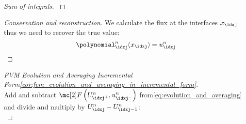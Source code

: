 \begin{proofbox}\nospacing
    \begin{proof}[Sum of integrals]\label{proof:conservation_reconstruction_int}
    \end{proof}
\end{proofbox}
\begin{proofbox}\nospacing
    \begin{proof}[Conservation and reconstruction]\label{proof:conservation_reconstruction}
        We calculate the flux at the interfaces $x_{\idxj}$ thus we need to recover the true value:
        \begin{align}
         \polynomial_{\idxj}^{n}(x_{\idxj})=u_{\idxj}^{n}
        \end{align}
    \end{proof}
\end{proofbox}
\begin{proofbox}\nospacing
    \begin{proof}[\newline FVM Evolution and Averaging Incremental Form\cref{cor:fvm_evolution_and_averaging_in_incremental_form}]\label{proof:cor:fvm_evolution_and_averaging_in_incremental_form}\leavevmode\\
        Add and subtract $\Flux \left(U_{\idxj^+}^{n},u_{\idxj^{-}}^{n}\right)$ from\cref{eq:evolution_and_averaging} and divide and multiply by
        $U_{\idxj}^{n}-U_{\idxj-1}^{n}$:\leavevmode\\
    \end{proof}
\end{proofbox}
